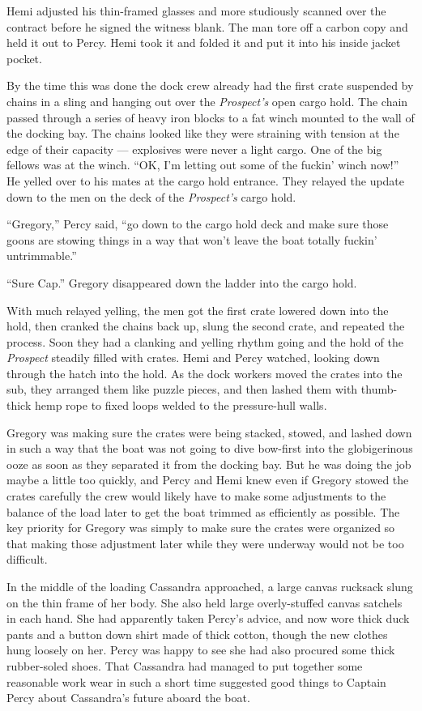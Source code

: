 \documentclass[
]{scrbook}
\begin{document}
Hemi adjusted his thin-framed glasses and more studiously scanned over
the contract before he signed the witness blank. The man tore off a
carbon copy and held it out to Percy. Hemi took it and folded it and put
it into his inside jacket pocket.

By the time this was done the dock crew already had the first crate
suspended by chains in a sling and hanging out over the
\emph{Prospect's} open cargo hold. The chain passed through a series of
heavy iron blocks to a fat winch mounted to the wall of the docking bay.
The chains looked like they were straining with tension at the edge of
their capacity --- explosives were never a light cargo. One of the big
fellows was at the winch. ``OK, I'm letting out some of the fuckin'
winch now!'' He yelled over to his mates at the cargo hold entrance.
They relayed the update down to the men on the deck of the
\emph{Prospect's} cargo hold.

``Gregory,'' Percy said, ``go down to the cargo hold deck and make sure
those goons are stowing things in a way that won't leave the boat
totally fuckin' untrimmable.''

``Sure Cap.'' Gregory disappeared down the ladder into the cargo hold.

With much relayed yelling, the men got the first crate lowered down into
the hold, then cranked the chains back up, slung the second crate, and
repeated the process. Soon they had a clanking and yelling rhythm going
and the hold of the \emph{Prospect} steadily filled with crates. Hemi
and Percy watched, looking down through the hatch into the hold. As the
dock workers moved the crates into the sub, they arranged them like
puzzle pieces, and then lashed them with thumb-thick hemp rope to fixed
loops welded to the pressure-hull walls.

Gregory was making sure the crates were being stacked, stowed, and
lashed down in such a way that the boat was not going to dive bow-first
into the globigerinous ooze as soon as they separated it from the
docking bay. But he was doing the job maybe a little too quickly, and
Percy and Hemi knew even if Gregory stowed the crates carefully the crew
would likely have to make some adjustments to the balance of the load
later to get the boat trimmed as efficiently as possible. The key
priority for Gregory was simply to make sure the crates were organized
so that making those adjustment later while they were underway would not
be too difficult.

In the middle of the loading Cassandra approached, a large canvas
rucksack slung on the thin frame of her body. She also held large
overly-stuffed canvas satchels in each hand. She had apparently taken
Percy's advice, and now wore thick duck pants and a button down shirt
made of thick cotton, though the new clothes hung loosely on her. Percy
was happy to see she had also procured some thick rubber-soled shoes.
That Cassandra had managed to put together some reasonable work wear in
such a short time suggested good things to Captain Percy about
Cassandra's future aboard the boat.
\end{document}
